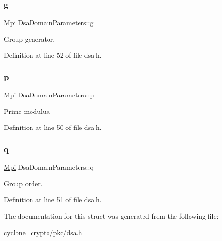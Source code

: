 \subsubsection{\texorpdfstring{g}{g}}
{\footnotesize\ttfamily \hyperlink{structMpi}{Mpi} Dsa\+Domain\+Parameters\+::g}



Group generator. 



Definition at line 52 of file dsa.\+h.

\mbox{\label{structDsaDomainParameters_a651791ea6179f2fa29caa4e8f7870bf8}} 
\subsubsection{\texorpdfstring{p}{p}}
{\footnotesize\ttfamily \hyperlink{structMpi}{Mpi} Dsa\+Domain\+Parameters\+::p}



Prime modulus. 



Definition at line 50 of file dsa.\+h.

\mbox{\label{structDsaDomainParameters_aa9078cd4d84fbe43a0661f9b50b78894}} 
\subsubsection{\texorpdfstring{q}{q}}
{\footnotesize\ttfamily \hyperlink{structMpi}{Mpi} Dsa\+Domain\+Parameters\+::q}



Group order. 



Definition at line 51 of file dsa.\+h.



The documentation for this struct was generated from the following file\+:\begin{DoxyCompactItemize}
\item 
cyclone\+\_\+crypto/pkc/\hyperlink{dsa_8h}{dsa.\+h}\end{DoxyCompactItemize}
